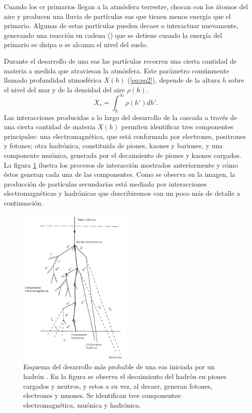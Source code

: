 Cuando los \gls{cr} primarios llegan a la atmósfera terrestre, chocan con los átomos del aire y producen una lluvia de partículas \gls{eas} que tienen menos energía que el primario. Algunas de estas partículas pueden decaer o interactuar nuevamente, generando una reacción en cadena (\cite{gaisser1990}) que se detiene cuando la energía del primario se disipa o se alcanza el nivel del suelo.

Durante el desarrollo de una \gls{eas} las partículas recorren una cierta cantidad de materia a medida que atraviesan la atmósfera. Este parámetro comúnmente llamado profundidad atmosférica $X(h)$   (\ref{eq:eq2}), depende de la altura $h$ sobre el nivel del mar y de la densidad del aire $\rho(h)$.  
\begin{equation}
X_{v}= \int_{h}^{\infty} \rho (h') dh'.
\label{eq:eq2}
\end{equation}
Las interacciones producidas a lo largo del desarrollo de la cascada a través de una cierta cantidad de materia $X(h)$ permiten identificar tres componentes principales: una electromagnética, que está conformada por electrones, positrones y fotones; otra hadrónica, constituida de piones, kaones y bariones, y una componente muónica, generada por el decaimiento de piones y kaones cargados. La figura \ref{fig:fig3} ilustra los procesos de interacción mostrados anteriormente y cómo éstos generan cada una de las componentes. Como se observa en la imagen, la producción de partículas secundarias está mediada por interacciones electromagnéticas y hadrónicas que describiremos con un poco más de detalle a continuación.

\begin{figure}[htb!]
\centering
    \begin{center}
        \includegraphics[width=0.5\textwidth]{Figs/componentes_cas.jpg}
    \end{center}{}
    \caption[Esquema del desarrollo de una \gls{eas} iniciada por un hadrón.]{Esquema del desarrollo más probable de una \gls{eas} iniciada por un hadrón \cite{mauro:tesis}. En la figura se observa el decaimiento del hadrón en piones cargados y neutros, y estos a su vez, al decaer, generan fotones, electrones y muones. Se identifican tres componentes: electromagnética, muónica y hadrónica.}
    \label{fig:fig3}
\end{figure}

